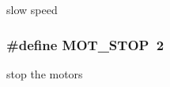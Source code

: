 slow speed \hypertarget{group__motor__commands_gaf57de7232e513663b5793fce23b2795a}{
\subsubsection[{M\-O\-T\-\_\-\-S\-T\-O\-P}]{\setlength{\rightskip}{0pt plus 5cm}\#define M\-O\-T\-\_\-\-S\-T\-O\-P~2}}\label{group__motor__commands_gaf57de7232e513663b5793fce23b2795a}
stop the motors 